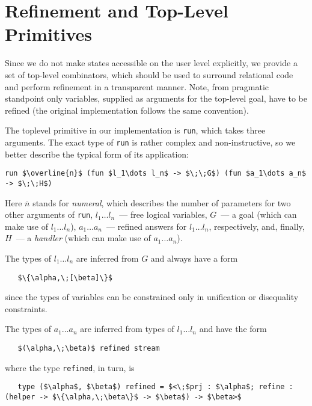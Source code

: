 \section{Refinement and Top-Level Primitives}
\label{refinement}

Since we do not make states accessible on the user level explicitly, we provide
a set of top-level combinators, which should be used to surround relational code
and perform refinement in a transparent manner. Note, from pragmatic
standpoint only variables, supplied as arguments for the top-level goal, have
to be refined (the original \miniKanren implementation follows the same convention).

The toplevel primitive in our implementation is \lstinline{run}, which takes three
arguments. The exact type of \lstinline{run} is rather complex and non-instructive, 
so we better describe the typical form of its application:

\begin{lstlisting}[mathescape=true]
   run $\overline{n}$ (fun $l_1\dots l_n$ -> $\;\;G$) (fun $a_1\dots a_n$ -> $\;\;H$)
\end{lstlisting}

Here $\overline{n}$ stands for \emph{numeral}, which describes the number of
parameters for two other arguments of \lstinline{run}, \mbox{$l_1\dots l_n$}~---
free logical variables, $G$~--- a goal (which can make use of \mbox{$l_1\dots l_n$}), 
\mbox{$a_1\dots a_n$}~--- refined answers for \mbox{$l_1\dots l_n$}, respectively, and, 
finally, $H$~--- a \emph{handler} (which can make use of \mbox{$a_1\dots a_n$}). 

The types of \mbox{$l_1\dots l_n$} are inferred from $G$ and always have a form

\begin{lstlisting}
   $\{\alpha,\;[\beta]\}$
\end{lstlisting}

since the types of variables can be constrained only in unification or disequality constraints.

The types of \mbox{$a_1\dots a_n$} are inferred from types of \mbox{$l_1\dots l_n$} and
have the form

\begin{lstlisting}
   $(\alpha,\;\beta)$ refined stream
\end{lstlisting}

where the type \lstinline{refined}, in turn, is

\begin{lstlisting}
   type ($\alpha$, $\beta$) refined = $<\;$prj : $\alpha$; refine : (helper -> $\{\alpha,\;\beta\}$ -> $\beta$) -> $\beta>$
\end{lstlisting}

